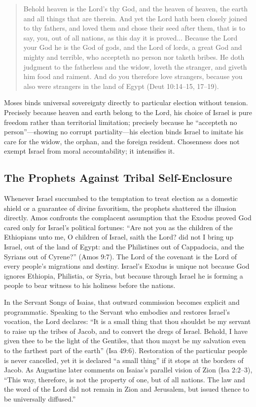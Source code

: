 \begin{quote}
Behold heaven is the Lord's thy God, and the heaven of heaven, the earth and all things that are therein. And yet the Lord hath been closely joined to thy fathers, and loved them and chose their seed after them, that is to say, you, out of all nations, as this day it is proved... Because the Lord your God he is the God of gods, and the Lord of lords, a great God and mighty and terrible, who accepteth no person nor taketh bribes. He doth judgment to the fatherless and the widow, loveth the stranger, and giveth him food and raiment. And do you therefore love strangers, because you also were strangers in the land of Egypt (Deut 10:14--15, 17--19).
\end{quote}

Moses binds universal sovereignty directly to particular election without tension. Precisely because heaven and earth belong to the Lord, his choice of Israel is pure freedom rather than territorial limitation; precisely because he ``accepteth no person''---showing no corrupt partiality---his election binds Israel to imitate his care for the widow, the orphan, and the foreign resident. Chosenness does not exempt Israel from moral accountability; it intensifies it.

\subsection{The Prophets Against Tribal Self-Enclosure}

Whenever Israel succumbed to the temptation to treat election as a domestic shield or a guarantee of divine favoritism, the prophets shattered the illusion directly. Amos confronts the complacent assumption that the Exodus proved God cared only for Israel's political fortunes: ``Are not you as the children of the Ethiopians unto me, O children of Israel, saith the Lord? did not I bring up Israel, out of the land of Egypt: and the Philistines out of Cappadocia, and the Syrians out of Cyrene?'' (Amos 9:7). The Lord of the covenant is the Lord of every people's migrations and destiny. Israel's Exodus is unique not because God ignores Ethiopia, Philistia, or Syria, but because through Israel he is forming a people to bear witness to his holiness before the nations.

In the Servant Songs of Isaias, that outward commission becomes explicit and programmatic. Speaking to the Servant who embodies and restores Israel's vocation, the Lord declares: ``It is a small thing that thou shouldst be my servant to raise up the tribes of Jacob, and to convert the dregs of Israel. Behold, I have given thee to be the light of the Gentiles, that thou mayst be my salvation even to the farthest part of the earth'' (Isa 49:6). Restoration of the particular people is never cancelled, yet it is declared ``a small thing'' if it stops at the borders of Jacob. As Augustine later comments on Isaias's parallel vision of Zion (Isa 2:2--3), ``This way, therefore, is not the property of one, but of all nations. The law and the word of the Lord did not remain in Zion and Jerusalem, but issued thence to be universally diffused.''

